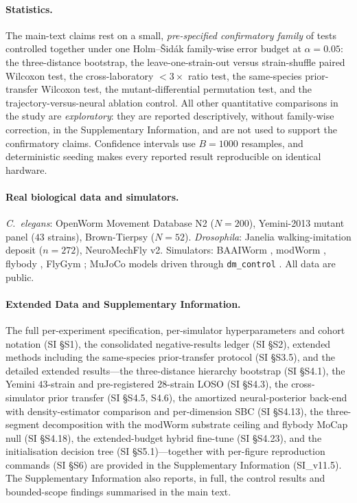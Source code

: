 \documentclass[11pt]{article}
\begin{document}
\paragraph{Statistics.} The main-text claims rest on a small, \emph{pre-specified confirmatory family} of tests controlled together under one Holm--\v{S}id\'ak family-wise error budget at $\alpha{=}0.05$: the three-distance bootstrap, the leave-one-strain-out versus strain-shuffle paired Wilcoxon test, the cross-laboratory $<3\times$ ratio test, the same-species prior-transfer Wilcoxon test, the mutant-differential permutation test, and the trajectory-versus-neural ablation control. All other quantitative comparisons in the study are \emph{exploratory}: they are reported descriptively, without family-wise correction, in the Supplementary Information, and are not used to support the confirmatory claims. Confidence intervals use $B{=}1000$ resamples, and deterministic seeding makes every reported result reproducible on identical hardware.

\paragraph{Real biological data and simulators.} \emph{C.~elegans}: OpenWorm Movement Database N2 ($N{=}200$), Yemini-2013 mutant panel ($43$ strains), Brown-Tierpsy ($N{=}52$). \emph{Drosophila}: Janelia walking-imitation deposit ($n{=}272$), NeuroMechFly v2. Simulators: BAAIWorm \citep{wang2025baaiworm}, modWorm \citep{shlizerman2025modworm}, flybody \citep{vaxenburg2025flybody}, FlyGym \citep{wangchen2024neuromechfly}; MuJoCo models driven through \texttt{dm\_control} \citep{tunyasuvunakool2020dmcontrol}. All data are public.

\paragraph{Extended Data and Supplementary Information.} The full per-experiment specification, per-simulator hyperparameters and cohort notation (SI \S S1), the consolidated negative-results ledger (SI \S S2), extended methods including the same-species prior-transfer protocol (SI \S S3.5), and the detailed extended results---the three-distance hierarchy bootstrap (SI \S S4.1), the Yemini $43$-strain and pre-registered $28$-strain LOSO (SI \S S4.3), the cross-simulator prior transfer (SI \S S4.5, S4.6), the amortized neural-posterior back-end with density-estimator comparison and per-dimension SBC (SI \S S4.13), the three-segment decomposition with the modWorm substrate ceiling and flybody MoCap null (SI \S S4.18), the extended-budget hybrid fine-tune (SI \S S4.23), and the initialisation decision tree (SI \S S5.1)---together with per-figure reproduction commands (SI \S S6) are provided in the Supplementary Information (SI\_v11.5). The Supplementary Information also reports, in full, the control results and bounded-scope findings summarised in the main text.
\end{document}
